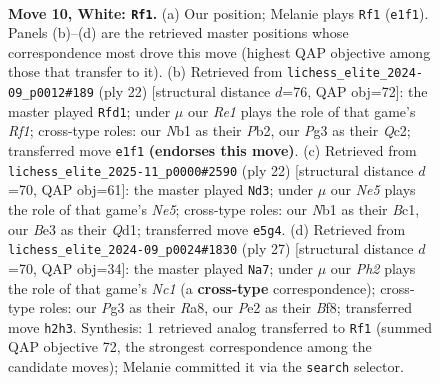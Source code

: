 \documentclass[11pt]{article}
\begin{document}
\clearpage

\begin{figure}[p]\centering
\begin{subfigure}{0.46\textwidth}\centering
\resizebox{\linewidth}{!}{%
\newchessgame
\chessboard[
  setfen={rnb2rk1/ppp1bppp/1n1qp3/4N3/2pP4/4B1P1/PP2PPBP/RN1QR1K1 w - - 6 10},
  showmover=false,
  pgfstyle=straightmove, color=movearrow, markmove={e1-f1}
]}
\caption{}
\end{subfigure}\hfill
\begin{subfigure}{0.46\textwidth}\centering
\resizebox{\linewidth}{!}{%
\newchessgame
\chessboard[
  setfen={rnb2rk1/p3bppp/1pp1pn2/2q1N3/2p2B2/2N3P1/PPQ1PPBP/R4RK1 w - - 2 12},
  showmover=false,
  pgfstyle=straightmove, color=movearrow, markmove={f1-d1}
]}
\caption{}
\end{subfigure}
\\[4pt]
\begin{subfigure}{0.46\textwidth}\centering
\resizebox{\linewidth}{!}{%
\newchessgame
\chessboard[
  setfen={rnb2rk1/1pq2ppp/p2bpn2/4N3/2Pp1P2/NP4P1/P2P2BP/R1BQ1RK1 w - - 0 12},
  showmover=false,
  pgfstyle=straightmove, color=movearrow, markmove={e5-d3}
]}
\caption{}
\end{subfigure}\hfill
\begin{subfigure}{0.46\textwidth}\centering
\resizebox{\linewidth}{!}{%
\newchessgame
\chessboard[
  setfen={r1n1kb1r/1p3ppp/q1n1p3/p2pP2b/B2P4/1Q5P/PP1N1PPN/R1B2RK1 b kq - 7 14},
  showmover=false,
  pgfstyle=straightmove, color=movearrow, markmove={c8-a7}
]}
\caption{}
\end{subfigure}
\caption{\textbf{Move 10, White: \texttt{Rf1}.} (a) Our position; Melanie plays \texttt{Rf1} (\texttt{e1f1}). Panels (b)--(d) are the retrieved master positions whose correspondence most drove this move (highest QAP objective among those that transfer to it). (b) Retrieved from \texttt{lichess\_elite\_2024-09\_p0012\#189} (ply 22) [structural distance $d$=76, QAP obj=72]: the master played \texttt{Rfd1}; under $\mu$ our \emph{Re1} plays the role of that game's \emph{Rf1}; cross-type roles: our \emph{N}b1 as their \emph{P}b2, our \emph{P}g3 as their \emph{Q}c2; transferred move \texttt{e1f1} \textbf{(endorses this move)}. (c) Retrieved from \texttt{lichess\_elite\_2025-11\_p0000\#2590} (ply 22) [structural distance $d$=70, QAP obj=61]: the master played \texttt{Nd3}; under $\mu$ our \emph{Ne5} plays the role of that game's \emph{Ne5}; cross-type roles: our \emph{N}b1 as their \emph{B}c1, our \emph{B}e3 as their \emph{Q}d1; transferred move \texttt{e5g4}. (d) Retrieved from \texttt{lichess\_elite\_2024-09\_p0024\#1830} (ply 27) [structural distance $d$=70, QAP obj=34]: the master played \texttt{Na7}; under $\mu$ our \emph{Ph2} plays the role of that game's \emph{Nc1} (a \textbf{cross-type} correspondence); cross-type roles: our \emph{P}g3 as their \emph{R}a8, our \emph{P}e2 as their \emph{B}f8; transferred move \texttt{h2h3}. Synthesis: 1 retrieved analog transferred to \texttt{Rf1} (summed QAP objective 72, the strongest correspondence among the candidate moves); Melanie committed it via the \texttt{search} selector.}
\label{fig:thought-m18}
\end{figure}
\end{document}
